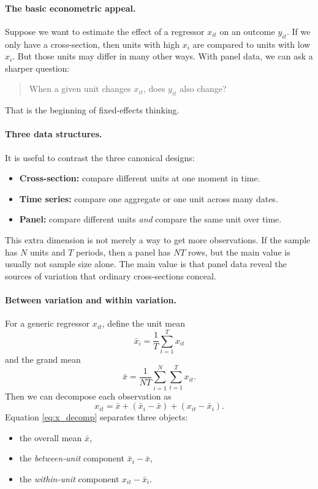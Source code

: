 \paragraph{The basic econometric appeal.}
Suppose we want to estimate the effect of a regressor $x_{it}$ on an outcome $y_{it}$. If we only have a cross-section, then units with high $x_i$ are compared to units with low $x_i$. But those units may differ in many other ways. With panel data, we can ask a sharper question:
\begin{quote}
When a given unit changes $x_{it}$, does $y_{it}$ also change?
\end{quote}
That is the beginning of fixed-effects thinking.

\paragraph{Three data structures.}
It is useful to contrast the three canonical designs:
\begin{itemize}
\item \textbf{Cross-section:} compare different units at one moment in time.
\item \textbf{Time series:} compare one aggregate or one unit across many dates.
\item \textbf{Panel:} compare different units \emph{and} compare the same unit over time.
\end{itemize}

This extra dimension is not merely a way to get more observations. If the sample has $N$ units and $T$ periods, then a panel has $NT$ rows, but the main value is usually not sample size alone. The main value is that panel data reveal the sources of variation that ordinary cross-sections conceal.

\paragraph{Between variation and within variation.}
For a generic regressor $x_{it}$, define the unit mean
\[
\bar{x}_i = \frac{1}{T}\sum_{t=1}^T x_{it}
\]
and the grand mean
\[
\bar{x} = \frac{1}{NT}\sum_{i=1}^N \sum_{t=1}^T x_{it}.
\]
Then we can decompose each observation as
\begin{equation}
x_{it} = \bar{x} + (\bar{x}_i-\bar{x}) + (x_{it}-\bar{x}_i).
\label{eq:x_decomp}
\end{equation}
Equation \eqref{eq:x_decomp} separates three objects:
\begin{itemize}
\item the overall mean $\bar{x}$,
\item the \emph{between-unit} component $\bar{x}_i-\bar{x}$,
\item the \emph{within-unit} component $x_{it}-\bar{x}_i$.
\end{itemize}

